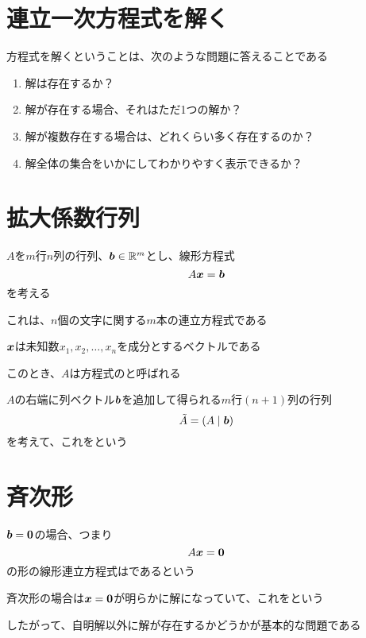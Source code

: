 \documentclass[../../../topic_linear-algebra]{subfiles}
\begin{document}
\sectionline
\section{連立一次方程式を解く}

方程式を解くということは、次のような問題に答えることである

\begin{enumerate}[label=\Alph*.]
  \item 解は存在するか？
  \item 解が存在する場合、それはただ1つの解か？
  \item 解が複数存在する場合は、どれくらい多く存在するのか？
  \item 解全体の集合をいかにしてわかりやすく表示できるか？
\end{enumerate}

\sectionline
\section{拡大係数行列}

$A$を$m$行$n$列の行列、$\vb*{b} \in \mathbb{R}^m$とし、線形方程式
\begin{equation*}
  A\vb*{x} = \vb*{b}
\end{equation*}
を考える

これは、$n$個の文字に関する$m$本の連立方程式である

$\vb*{x}$は未知数$x_1, x_2, \dots, x_n$を成分とするベクトルである

\br

このとき、$A$は方程式のと呼ばれる

$A$の右端に列ベクトル$\vb*{b}$を追加して得られる$m$行$(n+1)$列の行列
\begin{equation*}
  \tilde{A} = (A \mid \vb*{b})
\end{equation*}
を考えて、これをという

\sectionline
\section{斉次形}

$\vb*{b}=\vb*{0}$の場合、つまり
\begin{equation*}
  A\vb*{x} = \vb*{0}
\end{equation*}
の形の線形連立方程式はであるという

\br

斉次形の場合は$\vb*{x} = \vb*{0}$が明らかに解になっていて、これをという

したがって、自明解以外に解が存在するかどうかが基本的な問題である
\end{document}
